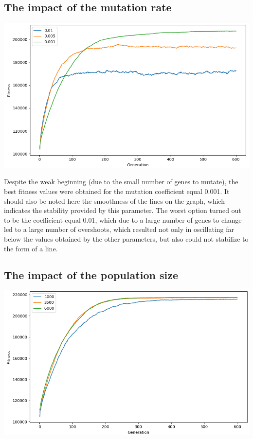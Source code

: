\documentclass[12pt]{article}
\begin{document}
\subsection{The impact of the mutation rate}
\hspace*{-1.5cm}
\includegraphics[scale=0.55]{mutation}

Despite the weak beginning (due to the small number of genes to mutate), the best fitness values were obtained for the mutation coefficient equal 0.001. It should also be noted here the smoothness of the lines on the graph, which indicates the stability provided by this parameter. The worst option turned out to be the coefficient equal 0.01, which due to a large number of genes to change led to a large number of overshoots, which resulted not only in oscillating far below the values obtained by the other parameters, but also could not stabilize to the form of a line.

\subsection{The impact of the population size}
\hspace*{-1.5cm}
\includegraphics[scale=0.55]{population2}
\end{document}
